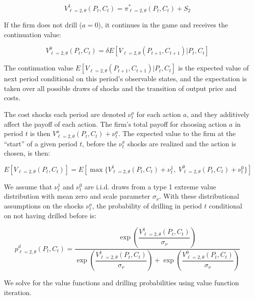 \documentclass[12pt]{article}
\begin{document}
\begin{equation}
V^1_{\ell=2,\theta}(P_t,C_t) = \pi^*_{\ell=2, \theta}(P_t,C_t) + S_{2}
\label{eq:one_period_profits_drilling}
\end{equation}

If the firm does not drill ($a=0$), it continues in the game and receives the continuation value:

\begin{equation}
V^0_{\ell=2,\theta}(P_t,C_t) = \delta E [V_{\ell=2,\theta}(P_{t+1},C_{t+1})|P_t,C_t]
\end{equation}

The continuation value $E [ V_{\ell=2,\theta}(P_{t+1},C_{t+1})|P_t,C_t]$ is the expected value of next period conditional on this period's observable states, and the expectation is taken over all possible draws of shocks and the transition of output price and costs. 

The cost shocks each period are denoted $\nu^a_t$ for each action $a$, and they additively affect the payoff of each action. The firm's total payoff for choosing action $a$ in period $t$ is then $V^a_{\ell=2,\theta}(P_t,C_t) + \nu^a_t$. The expected value to the firm at the ``start'' of a given period $t$, before the $\nu^a_t$ shocks are realized and the action is chosen, is then:

\begin{equation}
E[V_{\ell=2,\theta} (P_t,C_t)] = E [ \max\{ V^1_{\ell=2,\theta}(P_t,C_t) + \nu^1_t, \; V^0_{\ell=2,\theta}(P_t,C_t) + \nu^0_t \}]
\label{eq:expected_unconditional_value_i_eq_2}
\end{equation}

We assume that $\nu^{1}_t$ and $\nu^{0}_t$ are i.i.d. draws from a type 1 extreme value distribution with mean zero and scale parameter $\sigma_{\nu}$. With these distributional assumptions on the shocks $\nu^a_t$, the probability of drilling in period $t$ conditional on not having drilled before is:

\begin{equation}
p^d_{\ell=2,\theta}(P_t,C_t)  =
\dfrac{ \exp \left( \dfrac{V^1_{\ell=2, \theta}(P_t,C_t)}{\sigma_{\nu}} \right) }{ \exp \left( \dfrac{V^1_{\ell=2,\theta}(P_t,C_t)}{\sigma_{\nu}} \right) + \exp \left( \dfrac{V^0_{\ell=2,\theta}(P_t,C_t)}{\sigma_{\nu}} \right)  }
\label{eq:extensiondrillingprobs}
\end{equation}

We solve for the value functions and drilling probabilities using value function iteration.
\end{document}
